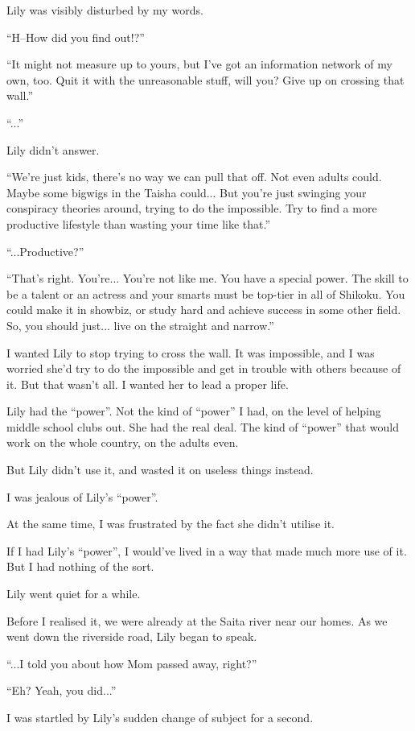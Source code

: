 Lily was visibly disturbed by my words.

``H--How did you find out!?''

``It might not measure up to yours, but I've got an information network of my own, too. Quit it with the unreasonable stuff, will you? Give up on crossing that wall.''

``...''

Lily didn't answer.

``We're just kids, there's no way we can pull that off. Not even adults could. Maybe some bigwigs in the Taisha could... But you're just swinging your conspiracy theories around, trying to do the impossible. Try to find a more productive lifestyle than wasting your time like that.''

``...Productive?''

``That's right. You're... You're not like me. You have a special power. The skill to be a talent or an actress and your smarts must be top-tier in all of Shikoku. You could make it in showbiz, or study hard and achieve success in some other field. So, you should just... live on the straight and narrow.''

I wanted Lily to stop trying to cross the wall. It was impossible, and I was worried she'd try to do the impossible and get in trouble with others because of it. But that wasn't all. I wanted her to lead a proper life.

Lily had the ``power''. Not the kind of ``power'' I had, on the level of helping middle school clubs out. She had the real deal. The kind of ``power'' that would work on the whole country, on the adults even.

But Lily didn't use it, and wasted it on useless things instead.

I was jealous of Lily's ``power''.

At the same time, I was frustrated by the fact she didn't utilise it.

If I had Lily's ``power'', I would've lived in a way that made much more use of it. But I had nothing of the sort.

Lily went quiet for a while.

Before I realised it, we were already at the Saita river near our homes. As we went down the riverside road, Lily began to speak.

``...I told you about how Mom passed away, right?''

``Eh? Yeah, you did...''

I was startled by Lily's sudden change of subject for a second.

